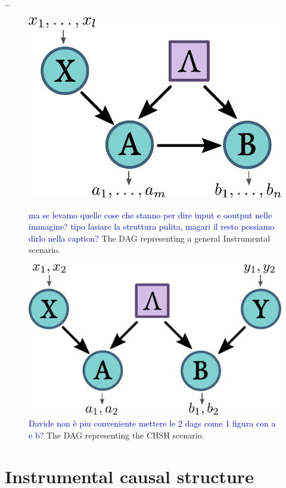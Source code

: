 \documentclass[
    nofootinbin,
    floatfix,
    amsfonts,
    twocolumn, 
    aps, 
    prl]{revtex4-1}
\begin{document}
\ldots

\begin{figure}[h]
    \centering
    \parbox{.9\columnwidth}{
        \includegraphics[width=.7\columnwidth]{images/instdag.pdf}
        \caption{\textcolor{blue}{ma se levamo quelle cose che stanno per dire input e ooutput nelle immagine? tipo lasiare la struttura pulita, magari il resto possiamo dirlo nella caption?} The DAG representing a general Instrumental scenario.}
        \label{fig:instdag}
    }

    \bigskip
    \parbox{.9\columnwidth}{
        \includegraphics[width=.8\columnwidth]{images/chshdag.pdf}
        \caption{\textcolor{blue}{Davide non è piu conveniente mettere le 2 dags come 1 figura con a e b?} The DAG representing the CHSH scenario.}
        \label{fig:chshdag}
    }
\end{figure}

\section*{Instrumental causal structure}
\end{document}
